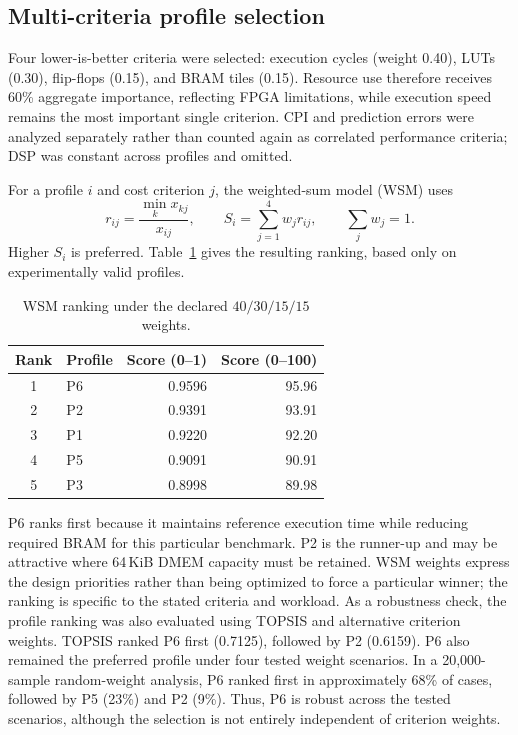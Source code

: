 \documentclass[12pt,a4paper]{article}
\begin{document}
\subsection{Multi-criteria profile selection}
Four lower-is-better criteria were selected: execution cycles (weight 0.40), LUTs (0.30), flip-flops (0.15), and BRAM tiles (0.15). Resource use therefore receives 60\% aggregate importance, reflecting FPGA limitations, while execution speed remains the most important single criterion. CPI and prediction errors were analyzed separately rather than counted again as correlated performance criteria; DSP was constant across profiles and omitted.

For a profile $i$ and cost criterion $j$, the weighted-sum model (WSM) uses
\[
 r_{ij}=\frac{\min_k x_{kj}}{x_{ij}},\qquad
 S_i=\sum_{j=1}^{4}w_j r_{ij},\qquad \sum_j w_j=1.
\]
Higher $S_i$ is preferred. Table~\ref{tab:wsm} gives the resulting ranking, based only on experimentally valid profiles.

\begin{table}[!htbp]\centering\small
\caption{WSM ranking under the declared $40/30/15/15$ weights.}\label{tab:wsm}
\begin{tabular}{@{}clrr@{}}\toprule
Rank & Profile & Score (0--1) & Score (0--100)\\\midrule
1 & P6 & 0.9596 & 95.96\\
2 & P2 & 0.9391 & 93.91\\
3 & P1 & 0.9220 & 92.20\\
4 & P5 & 0.9091 & 90.91\\
5 & P3 & 0.8998 & 89.98\\\bottomrule
\end{tabular}
\end{table}

P6 ranks first because it maintains reference execution time while reducing required BRAM for this particular benchmark. P2 is the runner-up and may be attractive where 64\,KiB DMEM capacity must be retained. WSM weights express the design priorities rather than being optimized to force a particular winner; the ranking is specific to the stated criteria and workload. As a robustness check, the profile ranking was also evaluated using TOPSIS and alternative criterion weights. TOPSIS ranked P6 first (0.7125), followed by P2 (0.6159). P6 also remained the preferred profile under four tested weight scenarios. In a 20,000-sample random-weight analysis, P6 ranked first in approximately 68\% of cases, followed by P5 (23\%) and P2 (9\%). Thus, P6 is robust across the tested scenarios, although the selection is not entirely independent of criterion weights.
\end{document}
